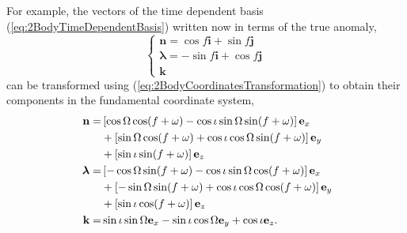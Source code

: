 For example, the vectors of the time dependent basis (\ref{eq:2BodyTimeDependentBasis}) written now in terms of the true anomaly,
\begin{equation}
\begin{cases}
\textbf{n} =\cos f \textbf{i} + \sin f \textbf{j}   \\
\boldsymbol{\lambda} = -\sin f \textbf{i} + \cos f \textbf{j} \\
\textbf{k} 
\end{cases} \label{eq:2BodyTimeDependentBasisinf}
\end{equation}
can be transformed using (\ref{eq:2BodyCoordinatesTransformation}) to obtain their components in the fundamental coordinate system,
\begin{subequations}\label{eq:timeDepBasis}
 \begin{align}
 \textbf{n} = & \left[ \cos \Omega \cos (f + \omega) - \cos \iota \sin \Omega \sin (f + \omega) \right] \textbf{e}_x \notag \\
 & + \left[ \sin \Omega \cos (f + \omega) + \cos \iota \cos \Omega \sin (f + \omega) \right]\textbf{e}_y \notag \\
 & + \left[ \sin \iota \sin (f + \omega) \right] \textbf{e}_z \\
 \boldsymbol{\lambda} = & \left[ - \cos \Omega \sin (f + \omega) - \cos \iota \sin \Omega \cos (f + \omega) \right] \textbf{e}_x \notag \\
 & + \left[ - \sin \Omega \sin (f + \omega) + \cos \iota \cos \Omega \cos (f + \omega) \right]\textbf{e}_y \notag \\
 & + \left[ \sin \iota \cos (f + \omega) \right] \textbf{e}_z \\
\textbf{ k} = & \sin \iota \sin \Omega \textbf{e}_x - \sin \iota \cos \Omega \textbf{e}_y + \cos \iota \textbf{e}_z .
 \end{align}
 \end{subequations} 
 
